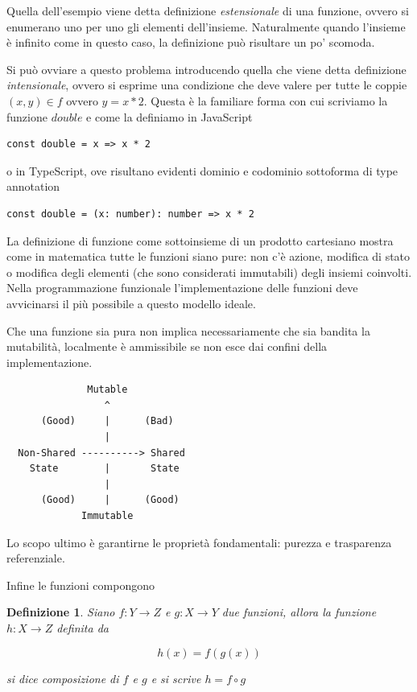 \documentclass[12pt]{article}
\newtheorem{definition}{Definizione}
\begin{document}
Quella dell'esempio viene detta definizione \emph{estensionale} di una funzione, ovvero si enumerano uno per uno gli elementi dell'insieme.
Naturalmente quando l'insieme è infinito come in questo caso, la definizione può risultare un po' scomoda.

Si può ovviare a questo problema introducendo quella che viene detta definizione \emph{intensionale},
ovvero si esprime una condizione che deve valere per tutte le coppie $(x, y) \in f$ ovvero $y = x * 2$. Questa è la familiare forma con cui scriviamo la funzione $double$ e come la definiamo in JavaScript

\begin{verbatim}
const double = x => x * 2
\end{verbatim}

o in TypeScript, ove risultano evidenti dominio e codominio sottoforma di type annotation

\begin{verbatim}
const double = (x: number): number => x * 2
\end{verbatim}

La definizione di funzione come sottoinsieme di un prodotto cartesiano mostra come in matematica tutte le funzioni siano pure:
non c'è azione, modifica di stato o modifica degli elementi (che sono considerati immutabili) degli insiemi coinvolti.
Nella programmazione funzionale l'implementazione delle funzioni deve avvicinarsi il più possibile a questo modello ideale.

Che una funzione sia pura non implica necessariamente che sia bandita la mutabilità, localmente è ammissibile
se non esce dai confini della implementazione.

\begin{verbatim}
              Mutable
                 ^
      (Good)     |      (Bad)
                 |
  Non-Shared ----------> Shared
    State        |       State
                 |
      (Good)     |      (Good)
             Immutable
\end{verbatim}

Lo scopo ultimo è garantirne le proprietà fondamentali: purezza e trasparenza referenziale.

Infine le funzioni compongono

\begin{definition}
Siano $f: Y \rightarrow Z$ e $g: X \rightarrow Y$ due funzioni, allora la funzione $h: X \rightarrow Z$ definita da

$$
h(x) = f(g(x))
$$

si dice \emph{composizione} di $f$ e $g$ e si scrive $h = f \circ g$

\end{definition}
\end{document}
